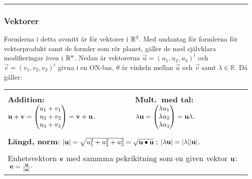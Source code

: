 \documentclass{article}
\begin{document}
\vspace{2mm}\hrule


\subsubsection*{Vektorer}%

Formlerna i detta avsnitt är för vektorer i ${\mathbb R}^3$. Med
undantag för formlerna för vektorprodukt samt de formler som rör
planet, gäller de med självklara modifieringar även i ${\mathbb R}^n$.
Nedan är vektorerna $\vec u=(u_1,u_2,u_3)^t$ och $\vec
v=(v_1,v_2,v_3)^t$ givna i en ON-bas, $\theta$ är vinkeln mellan
$\vec u$ och $\vec v$ samt $\lambda\in\mathbb R$. Då gäller:

\medskip
\begin{tabular}{|l|l|}
  \hline  &  \\[-8pt]
  \textbf{Addition: } 
  $\bdu+\bdv=\trevektor[u_1+v_1,u_2+v_2,u_3+v_3]=\bdv + \bdu$.
  &
  \textbf{Mult.~med tal: }
  $\lambda\bdu=\trevektor[\lambda u_1,\lambda u_2,\lambda u_3] = \bdu\lambda$.
  \\[15pt] \hline \multicolumn{2}{|c|}{} \\[-9pt]
  \multicolumn{2}{|l|}{\textbf{Längd, norm}: \;
  $|{\mathbf u}|
    =\sqrt{u_1^2+u_2^2+u_3^2} 
  = \sqrt{{\mathbf u}\bullet{\mathbf u}}$\,; 
    \; $|\lambda{\mathbf u}|=|\lambda||{\mathbf u}|$.
  } %
  \\[8pt] \hline \multicolumn{2}{|c|}{} \\[-9pt]
  \multicolumn{2}{|l|}{Enhetsvektorn \/${\mathbf e}$\/ 
  med sammma pekrikitning som en given vektor ${\mathbf u}$:
  $
  \; {\mathbf e} = \frac{{\mathbf u}}{|{\mathbf u}|}\cdot
  $
  } %
  \\[8pt] \hline
\end{tabular}%

\smallskip
\end{document}
